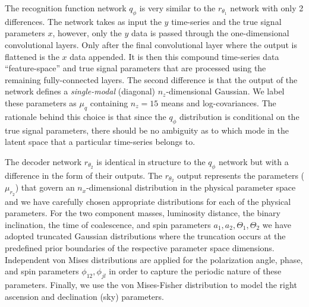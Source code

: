 \documentclass[%
showpacs,
nofootinbib,
 amsmath,amssymb,
 aps,
 twocolumn,
 prl,
 reprint,
floatfix,
]{revtex4-1}
\begin{document}
%
% 
The recognition function network $q_{\phi}$ is very similar to the
$r_{\theta_1}$ network with only 2 differences. The network takes as input the
$y$ time-series and the true signal parameters $x$, however, only the $y$ data
is passed through the one-dimensional convolutional layers. Only after the
final convolutional layer where the output is flattened is the $x$ data
appended. It is then this compound time-series data ``feature-space'' and true
signal parameters that are processed using the remaining fully-connected
layers. The second difference is that the output of the network defines a
\emph{single-modal} (diagonal) $n_z$-dimensional Gaussian. We label these
parameters as $\mu_{q}$ containing $n_z=15$ means and log-covariances. The
rationale behind this choice is that since the $q_{\phi}$ distribution is
conditional on the true signal parameters, there should be no ambiguity as to
which mode in the latent space that a particular time-series belongs to.      

%
%
The decoder network $r_{\theta_2}$ is identical in structure to the
$q_{\phi}$ network but with a difference in the form of their outputs. The
$r_{\theta_2}$ output represents the parameters ($\mu_{r_2}$) that govern an
$n_x$-dimensional distribution in the physical parameter space and we have
carefully chosen appropriate distributions for each of the physical parameters.
For the two component masses, luminosity distance, the binary inclination, the time of
coalescence, and spin parameters $a_1,a_2,\Theta_1,\Theta_2$ we have 
adopted truncated Gaussian distributions where the
truncation occurs at the predefined prior boundaries of the respective
parameter space dimensions. 
Independent von Mises distributions are applied for the polarization angle,  phase, 
and spin parameters $\phi_{12},\phi_{jl}$ in order to capture the periodic 
nature of these parameters. Finally, we use the von Mises-Fisher distribution
to model the right ascension and declination (sky) parameters.    
\end{document}
